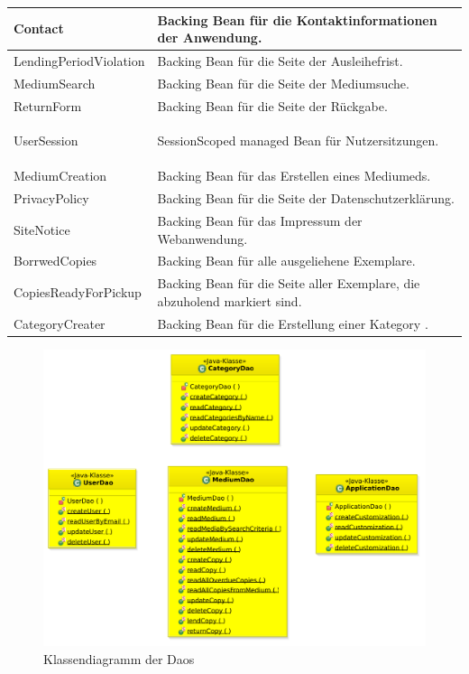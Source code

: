 \documentclass{article}
\begin{document}
\begin{center}
\begin{table}
\begin{tabular} { |p{}|p{}| }
            \hline
            Contact & Backing Bean für die Kontaktinformationen der Anwendung.\\
            \hline
            LendingPeriodViolation & Backing Bean für die Seite der Ausleihefrist.\\
            \hline
            MediumSearch & Backing Bean für die Seite der Mediumsuche.\\
            \hline
            ReturnForm & Backing Bean für die Seite der Rückgabe.\\
            \hline
            \hypertarget{Session}{UserSession} & SessionScoped managed Bean für Nutzersitzungen.\\
            \hline
            MediumCreation & Backing Bean für das Erstellen eines  Mediumeds.\\
            \hline
            PrivacyPolicy & Backing Bean für die Seite der Datenschutzerklärung.\\
            \hline
            SiteNotice & Backing Bean für das Impressum der  Webanwendung.\\
            \hline
            BorrwedCopies & Backing Bean für alle ausgeliehene Exemplare.\\
            \hline
            CopiesReadyForPickup & Backing Bean für die Seite aller Exemplare, die abzuholend markiert sind.\\
            \hline
            CategoryCreater & Backing Bean für die Erstellung einer Kategory .\\
            \hline
        \end{tabular}
    \end{table}
\end{center}

\begin{center}
    \begin{figure}[H]
	\hypertarget{DAOs}{}
        \includegraphics[scale=0.6]{KlassendiagrammDaos.pdf}
        \caption{Klassendiagramm der Daos  }
        \label{fig:DAO Klassendiagramm}
    \end{figure}
\end{center}
\end{document}
